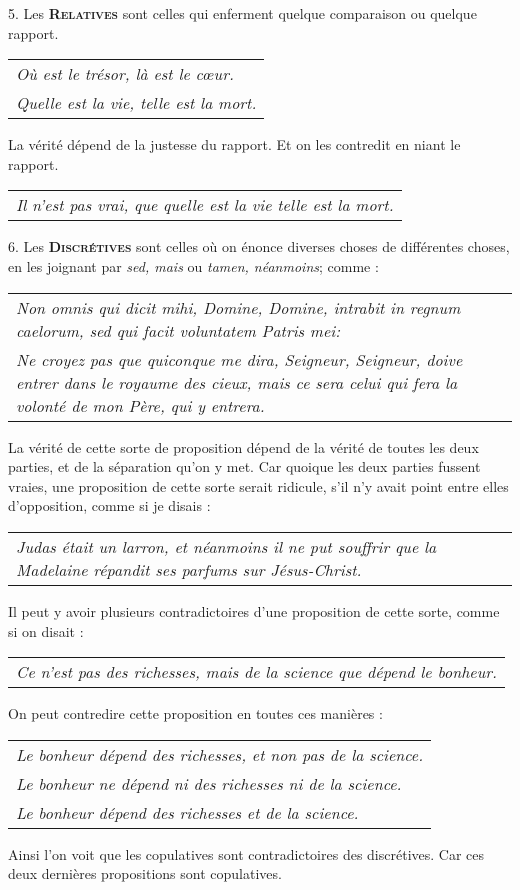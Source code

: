 \bigbreak
{5.} Les {\bfseries\scshape Relatives} sont celles qui enferment quelque comparaison ou quelque rapport.
	\begin{tabularx}{\textwidth}{X}
		\emph{Où est le trésor, là est le cœur.} \\
		\emph{Quelle est la vie, telle est la mort.} \\
	\end{tabularx}

La vérité dépend de la justesse du rapport. Et on les contredit en niant le rapport.
	\begin{tabularx}{\textwidth}{X}
		\emph{Il n'est pas vrai, que quelle est la vie telle est la mort.} \\
	\end{tabularx}

\bigbreak
{6.} Les {\bfseries\scshape Discrétives} sont celles où on énonce diverses choses de différentes choses, en les joignant par \emph{sed, mais} ou \emph{tamen, néanmoins}; comme :
	\begin{tabularx}{\textwidth}{X}
		\emph{Non omnis qui dicit mihi, Domine, Domine, intrabit in regnum caelorum, sed qui facit voluntatem Patris mei:} \\
		\emph{Ne croyez pas que quiconque me dira, Seigneur, Seigneur, doive entrer dans le royaume des cieux, mais ce sera celui qui fera la volonté de mon Père, qui y entrera.} \\
	\end{tabularx}

La vérité de cette sorte de proposition dépend de la vérité de toutes les deux parties, et de la séparation qu'on y met. Car quoique les deux parties fussent vraies, une proposition de cette sorte serait ridicule, s'il n'y avait point entre elles d'opposition, comme si je disais :
	\begin{tabularx}{\textwidth}{X}
		\emph{Judas était un larron, et néanmoins il ne put souffrir que la Madelaine répandit ses parfums sur Jésus-Christ.} \\
	\end{tabularx}

Il peut y avoir plusieurs contradictoires d'une proposition de cette sorte, comme si on disait :
	\begin{tabularx}{\textwidth}{X}
\emph{Ce n'est pas des richesses, mais de la science que dépend le bonheur.}
	\end{tabularx}

On peut contredire cette proposition en toutes ces manières :
	\begin{tabularx}{\textwidth}{X}
		\emph{Le bonheur dépend des richesses, et non pas de la science.} \\
		\emph{Le bonheur ne dépend ni des richesses ni de la science.} \\
		\emph{Le bonheur dépend des richesses et de la science.} \\
	\end{tabularx}

Ainsi l'on voit que les copulatives sont contradictoires des discrétives. Car ces deux dernières propositions sont copulatives.
